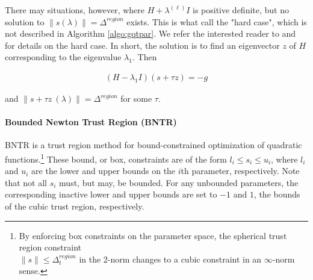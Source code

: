 \noindent There may situations, however, where $H + \lambda^{(\ell)} I$ is positive definite, but no solution to $ \lVert s (\lambda)  \rVert = \Delta^{region} $ exists. This is what \cite{More1983} call the "hard case", which is not described in Algorithm \ref{algo:gqtpar}. We refer the interested reader to \cite{More1983} and \cite{Conn2000} for details on the hard case. In short, the solution is to find an eigenvector $z$ of $H$ corresponding to the eigenvalue $\lambda_1$. Then

\begin{align}
    \left(H-\lambda_1 I\right)(s+\tau z)=-g
    \label{eq:hard-case}
\end{align}

\noindent and $ \lVert s +\tau z \ (\lambda) \rVert  = \Delta^{region}  $ for some $\tau$.





\paragraph{Bounded Newton Trust Region (BNTR)}

BNTR is a trust region method for bound-constrained optimization of quadratic functions.\footnote{By enforcing box constraints on the parameter space, the spherical trust region constraint \\
$\lVert s \rVert \leq \Delta^{region}_{t}$ in the 2-norm changes to a cubic constraint in an $\infty$-norm sense.}
These bound, or box, constraints are of the form
$l_i \leq s_i \leq u_i$, where $l_i$ and $u_i$ are the lower and upper bounds on the $i$th parameter, respectively.
Note that not all $s_i$ must, but may, be bounded. For any unbounded parameters, the corresponding inactive lower and upper bounds are set to $-1$ and $1$, the bounds of the cubic trust region, respectively.


